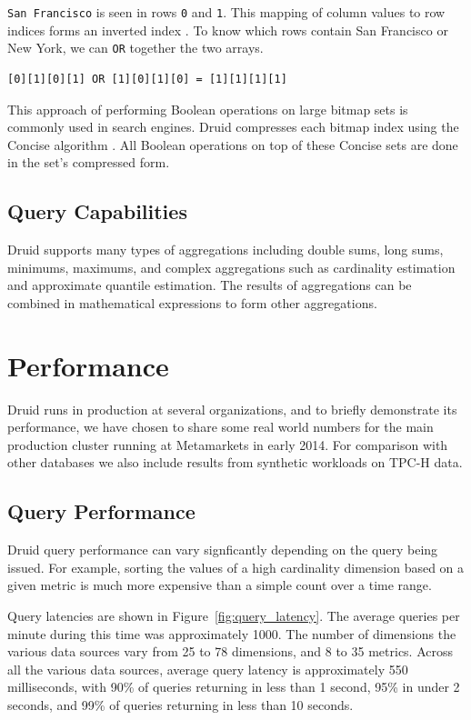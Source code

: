 \documentclass{vldb}
\begin{document}
\texttt{San Francisco} is seen in rows \texttt{0} and \texttt{1}. This mapping of column values
to row indices forms an inverted index \cite{tomasic1993performance}. To know which
rows contain {\ttfamily San Francisco} or {\ttfamily New York}, we can \texttt{OR} together
the two arrays.
{\small\begin{verbatim}
[0][1][0][1] OR [1][0][1][0] = [1][1][1][1]
\end{verbatim}}

This approach of performing Boolean operations on large bitmap sets is commonly
used in search engines. Druid compresses each bitmap index using the Concise
algorithm \cite{colantonio2010concise}. All Boolean operations on top of these
Concise sets are done in the set's compressed form. 

\subsection{Query Capabilities}
Druid supports many types of aggregations including double sums, long sums,
minimums, maximums, and complex aggregations such as cardinality estimation and
approximate quantile estimation.  The results of aggregations can be combined
in mathematical expressions to form other aggregations. 

\section{Performance}
Druid runs in production at several organizations, and to briefly demonstrate its
performance, we have chosen to share some real world numbers for the main production
cluster running at Metamarkets in early 2014. For comparison with other databases
we also include results from synthetic workloads on TPC-H data.

\subsection{Query Performance}
Druid query performance can vary signficantly depending on the query
being issued. For example, sorting the values of a high cardinality dimension
based on a given metric is much more expensive than a simple count over a time
range.

Query latencies are shown in Figure~\ref{fig:query_latency}. The average
queries per minute during this time was approximately 1000. The number of
dimensions the various data sources vary from 25 to 78 dimensions, and 8 to 35
metrics. Across all the various data sources, average query latency is
approximately 550 milliseconds, with 90\% of queries returning in less than 1
second, 95\% in under 2 seconds, and 99\% of queries returning in less than 10
seconds.  
\end{document}
